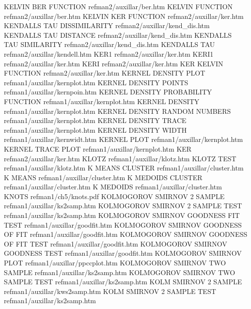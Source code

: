 KELVIN BER FUNCTION                     refman2/auxillar/ber.htm
KELVIN FUNCTION                         refman2/auxillar/ber.htm
KELVIN KER FUNCTION                     refman2/auxillar/ker.htm
KENDALLS TAU DISSIMILARITY              refman2/auxillar/kend_dis.htm
KENDALLS TAU DISTANCE                   refman2/auxillar/kend_dis.htm
KENDALLS TAU SIMILARITY                 refman2/auxillar/kend_dis.htm
KENDALLS TAU                            refman2/auxillar/kendell.htm
KER1                                    refman2/auxillar/ker.htm
KERI1                                   refman2/auxillar/ker.htm
KERI                                    refman2/auxillar/ker.htm
KER KELVIN FUNCTION                     refman2/auxillar/ker.htm
KERNEL DENSITY PLOT                     refman1/auxillar/kernplot.htm
KERNEL DENSITY POINTS                   refman1/auxillar/kernpoin.htm
KERNEL DENSITY PROBABILITY FUNCTION     refman1/auxillar/kernplot.htm
KERNEL DENSITY                          refman1/auxillar/kernplot.htm
KERNEL DENSITY RANDOM NUMBERS           refman1/auxillar/kernplot.htm
KERNEL DENSITY TRACE                    refman1/auxillar/kernplot.htm
KERNEL DENSITY WIDTH                    refman1/auxillar/kernwidt.htm
KERNEL PLOT                             refman1/auxillar/kernplot.htm
KERNEL TRACE PLOT                       refman1/auxillar/kernplot.htm
KER                                     refman2/auxillar/ker.htm
KLOTZ                                   refman1/auxillar/klotz.htm
KLOTZ TEST                              refman1/auxillar/klotz.htm
K MEANS CLUSTER                         refman1/auxillar/cluster.htm
K MEANS                                 refman1/auxillar/cluster.htm
K MEDOIDS CLUSTER                       refman1/auxillar/cluster.htm
K MEDOIDS                               refman1/auxillar/cluster.htm
KNOTS                                   refman1/ch5/knots.pdf
KOLMOGOROV SMIRNOV 2 SAMPLE             refman1/auxillar/ks2samp.htm
KOLMOGOROV SMIRNOV 2 SAMPLE TEST        refman1/auxillar/ks2samp.htm
KOLMOGOROV SMIRNOV GOODNESS FIT TEST    refman1/auxillar/goodfit.htm
KOLMOGOROV SMIRNOV GOODNESS OF FIT      refman1/auxillar/goodfit.htm
KOLMOGOROV SMIRNOV GOODNESS OF FIT TEST refman1/auxillar/goodfit.htm
KOLMOGOROV SMIRNOV GOODNESS TEST        refman1/auxillar/goodfit.htm
KOLMOGOROV SMIRNOV PLOT                 refman1/auxillar/ppccplot.htm
KOLMOGOROV SMIRNOV TWO SAMPLE           refman1/auxillar/ks2samp.htm
KOLMOGOROV SMIRNOV TWO SAMPLE TEST      refman1/auxillar/ks2samp.htm
KOLM SMIRNOV 2 SAMPLE                   refman1/auxillar/kws2samp.htm
KOLM SMIRNOV 2 SAMPLE TEST              refman1/auxillar/ks2samp.htm
